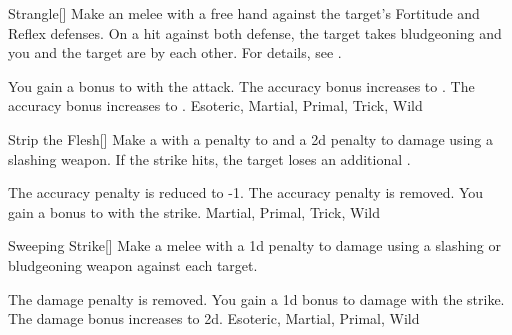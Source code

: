 \lowercase{\hypertarget{maneuver:Strangle}{}}\label{maneuver:Strangle}
\hypertarget{maneuver:Strangle}{}
\begin{freeability}[Rank 1]{Strangle}[]
Make an melee  with a free hand against the target's Fortitude and Reflex defenses.
On a hit against both defense, the target takes bludgeoning  and you and the target are  by each other.
For details, see .

\rankline
{} You gain a  bonus to  with the attack.
 The accuracy bonus increases to .
 The accuracy bonus increases to .
 Esoteric, Martial, Primal, Trick, Wild
\end{freeability}
\vspace{0.25em}



\lowercase{\hypertarget{maneuver:Strip the Flesh}{}}\label{maneuver:Strip the Flesh}
\hypertarget{maneuver:Strip the Flesh}{}
\begin{freeability}[Rank 1]{Strip the Flesh}[]
Make a  with a  penalty to  and a \minus2d penalty to damage using a slashing weapon.
If the strike hits, the target loses an additional .

\rankline
{} The accuracy penalty is reduced to -1.
 The accuracy penalty is removed.
 You gain a  bonus to  with the strike.
 Martial, Primal, Trick, Wild
\end{freeability}
\vspace{0.25em}



\lowercase{\hypertarget{maneuver:Sweeping Strike}{}}\label{maneuver:Sweeping Strike}
\hypertarget{maneuver:Sweeping Strike}{}
\begin{freeability}[Rank 1]{Sweeping Strike}[]
Make a melee  with a \minus1d penalty to damage using a slashing or bludgeoning weapon against each target.

\rankline
{} The damage penalty is removed.
 You gain a \plus1d bonus to damage with the strike.
 The damage bonus increases to \plus2d.
 Esoteric, Martial, Primal, Wild
\end{freeability}
\vspace{0.25em}



